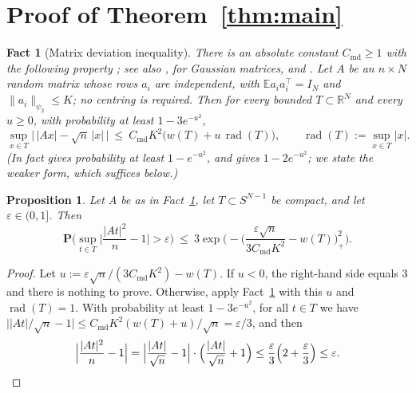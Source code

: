 \documentclass[11pt]{article}
\newtheorem{proposition}[theorem]{Proposition}
\newtheorem{fact}[theorem]{Fact}
\theoremstyle{definition}
\numberwithin{equation}{section}
\newcommand{\R}{\mathbb{R}}
\newcommand{\E}{\mathbb{E}}
\newcommand{\Prob}{\mathbf{P}}
\newcommand{\eps}{\varepsilon}
\newcommand{\psitwo}[1]{\lVert #1\rVert_{\psi_2}}
\DeclareMathOperator{\rad}{rad}
\newcommand{\Cmd}{C_{\mathrm{md}}}
\begin{document}
\section{Proof of Theorem~\ref{thm:main}}\label{sec:proof-main}

\begin{fact}[Matrix deviation inequality]\label{fact:md}
There is an absolute constant $\Cmd\ge1$ with the following property \cite[Thm.~1.4]{LMPV}; see also \cite[Exercise~9.1.8]{Vershynin}, \cite{Gordon} for Gaussian matrices, and \cite{MPT}. Let $A$ be an $n\times N$ random matrix whose rows $a_i$ are independent, with $\E a_ia_i^\top=I_N$ and $\psitwo{a_i}\le K$; no centring is required. Then for every bounded $T\subset\R^N$ and every $u\ge0$, with probability at least $1-3e^{-u^2}$,
\[
\sup_{x\in T}\big|\,|Ax|-\sqrt n\,|x|\,\big|\ \le\ \Cmd K^2\big(w(T)+u\,\rad(T)\big),\qquad\rad(T):=\sup_{x\in T}|x| .
\]
(In fact \cite[Thm.~1.4]{LMPV} gives probability at least $1-e^{-u^2}$, and \cite[Exercise~9.1.8]{Vershynin} gives $1-2e^{-u^2}$; we state the weaker form, which suffices below.)
\end{fact}

\begin{proposition}\label{prop:dev}
Let $A$ be as in Fact~\ref{fact:md}, let $T\subset S^{N-1}$ be compact, and let $\eps\in(0,1]$. Then
\[
\Prob\Big(\sup_{t\in T}\Big|\frac{|At|^2}{n}-1\Big|>\eps\Big)\ \le\ 3\exp\!\Big(-\Big(\frac{\eps\sqrt n}{3\Cmd K^2}-w(T)\Big)_+^2\Big).
\]
\end{proposition}

\begin{proof}
Let $u:=\eps\sqrt n/(3\Cmd K^2)-w(T)$. If $u<0$, the right-hand side equals $3$ and there is nothing to prove. Otherwise, apply Fact~\ref{fact:md} with this $u$ and $\rad(T)=1$. With probability at least $1-3e^{-u^2}$, for all $t\in T$ we have $\big||At|/\sqrt n-1\big|\le\Cmd K^2(w(T)+u)/\sqrt n=\eps/3$, and then
\[
\Big|\frac{|At|^2}{n}-1\Big|=\Big|\frac{|At|}{\sqrt n}-1\Big|\cdot\Big(\frac{|At|}{\sqrt n}+1\Big)\le\frac\eps3\Big(2+\frac\eps3\Big)\le\eps .\qedhere
\]
\end{proof}
\end{document}
